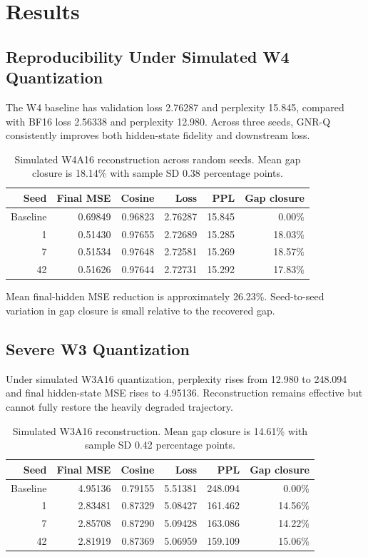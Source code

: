 \documentclass[11pt]{article}
\begin{document}
\section{Results}

\subsection{Reproducibility Under Simulated W4 Quantization}

The W4 baseline has validation loss 2.76287 and perplexity 15.845, compared with BF16 loss 2.56338 and perplexity 12.980. Across three seeds, GNR-Q consistently improves both hidden-state fidelity and downstream loss.

\begin{table}[t]
\centering
\small
\begin{tabular}{rrrrrr}
\toprule
Seed & Final MSE & Cosine & Loss & PPL & Gap closure \\
\midrule
Baseline & 0.69849 & 0.96823 & 2.76287 & 15.845 & 0.00\% \\
1 & 0.51430 & 0.97655 & 2.72689 & 15.285 & 18.03\% \\
7 & 0.51534 & 0.97648 & 2.72581 & 15.269 & 18.57\% \\
42 & 0.51626 & 0.97644 & 2.72731 & 15.292 & 17.83\% \\
\bottomrule
\end{tabular}
\caption{Simulated W4A16 reconstruction across random seeds. Mean gap closure is 18.14\% with sample SD 0.38 percentage points.}
\label{tab:w4seeds}
\end{table}

Mean final-hidden MSE reduction is approximately 26.23\%. Seed-to-seed variation in gap closure is small relative to the recovered gap.

\subsection{Severe W3 Quantization}

Under simulated W3A16 quantization, perplexity rises from 12.980 to 248.094 and final hidden-state MSE rises to 4.95136. Reconstruction remains effective but cannot fully restore the heavily degraded trajectory.

\begin{table}[t]
\centering
\small
\begin{tabular}{rrrrrr}
\toprule
Seed & Final MSE & Cosine & Loss & PPL & Gap closure \\
\midrule
Baseline & 4.95136 & 0.79155 & 5.51381 & 248.094 & 0.00\% \\
1 & 2.83481 & 0.87329 & 5.08427 & 161.462 & 14.56\% \\
7 & 2.85708 & 0.87290 & 5.09428 & 163.086 & 14.22\% \\
42 & 2.81919 & 0.87369 & 5.06959 & 159.109 & 15.06\% \\
\bottomrule
\end{tabular}
\caption{Simulated W3A16 reconstruction. Mean gap closure is 14.61\% with sample SD 0.42 percentage points.}
\label{tab:w3seeds}
\end{table}
\end{document}

